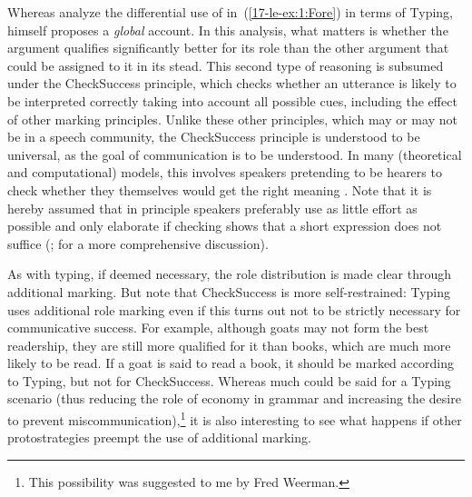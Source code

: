 \documentclass[output=paper]{LSP/langsci}
\begin{document}
Whereas \cite{donohueanddonohue} analyze the differential use of  in~(\ref{17-le-ex:1:Fore}) in terms of Typing, \cite{Scott1987Fore} himself proposes a \textit{global} account. In this analysis, what matters is whether the argument qualifies significantly better for its role than the other argument that could be assigned to it in its stead. This second type of reasoning is subsumed under the CheckSuccess principle, which checks whether an utterance is likely to be interpreted correctly taking into account all possible cues, including the effect of other marking principles. Unlike these other principles, which may or may not be  in a speech community, the CheckSuccess principle is understood to be universal, as the goal of communication is to be understood. In many (theoretical and computational) models, this involves speakers pretending to be hearers to check whether they themselves would get the right meaning \citep[cf.][]{Levelt1983Monitoring, Hurford1989Biological, Zeevat2000Asymmetry, Steels2003Language, BlutneretalOptimalOptimal, deSwart2011Sense}. Note that it is hereby assumed that in principle speakers preferably use as little effort as possible and only elaborate if checking shows that a short expression does not suffice (\citealt{Grice1975Logic}; \cf \citealt{Lestradeetal2016Origin} for a more comprehensive discussion).

As with typing, if deemed necessary, the role distribution is made clear through additional marking. But note that CheckSuccess is more self-restrained: Typing uses additional role marking even if this turns out not to be strictly necessary for communicative success. For example, although goats may not form the best readership, they are still more qualified for it than books, which are much more likely to be read. If a goat is said to read a book, it should be marked according to Typing, but not for CheckSuccess. Whereas much could be said for a Typing scenario (thus reducing the role of economy in grammar and increasing the desire to prevent miscommunication),\footnote{This possibility was suggested to me by Fred Weerman.} it is also interesting to see what happens if other protostrategies preempt the use of additional marking. 
\end{document}
